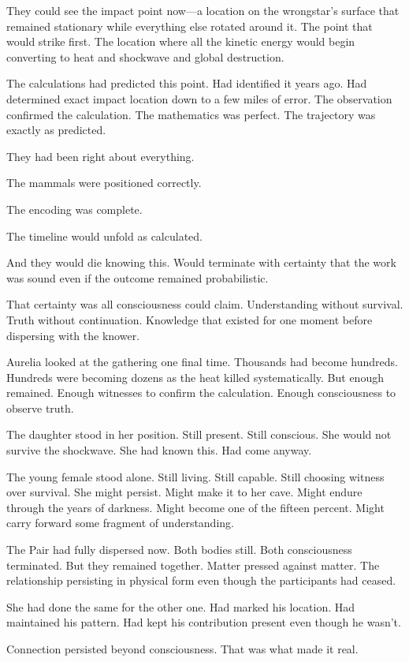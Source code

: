 They could see the impact point now—a location on the wrongstar's surface that remained stationary while everything else rotated around it. The point that would strike first. The location where all the kinetic energy would begin converting to heat and shockwave and global destruction.

The calculations had predicted this point. Had identified it years ago. Had determined exact impact location down to a few miles of error. The observation confirmed the calculation. The mathematics was perfect. The trajectory was exactly as predicted.

They had been right about everything.

The mammals were positioned correctly.

The encoding was complete.

The timeline would unfold as calculated.

And they would die knowing this. Would terminate with certainty that the work was sound even if the outcome remained probabilistic.

That certainty was all consciousness could claim. Understanding without survival. Truth without continuation. Knowledge that existed for one moment before dispersing with the knower.

Aurelia looked at the gathering one final time. Thousands had become hundreds. Hundreds were becoming dozens as the heat killed systematically. But enough remained. Enough witnesses to confirm the calculation. Enough consciousness to observe truth.

The daughter stood in her position. Still present. Still conscious. She would not survive the shockwave. She had known this. Had come anyway.

The young female stood alone. Still living. Still capable. Still choosing witness over survival. She might persist. Might make it to her cave. Might endure through the years of darkness. Might become one of the fifteen percent. Might carry forward some fragment of understanding.

The Pair had fully dispersed now. Both bodies still. Both consciousness terminated. But they remained together. Matter pressed against matter. The relationship persisting in physical form even though the participants had ceased.

She had done the same for the other one. Had marked his location. Had maintained his pattern. Had kept his contribution present even though he wasn't.

Connection persisted beyond consciousness. That was what made it real.

